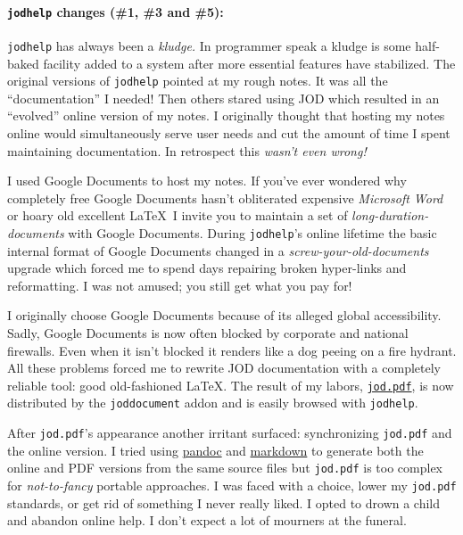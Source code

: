 \paragraph{\texorpdfstring{\texttt{jodhelp} changes (\#1, \#3 and
\#5):}{jodhelp changes (\#1, \#3 and \#5):}}

\texttt{jodhelp} has always been a \emph{kludge.} In programmer speak a
kludge is some half-baked facility added to a system after more
essential features have stabilized. The original versions of
\texttt{jodhelp} pointed at my rough notes. It was all the
``documentation'' I needed! Then others stared using JOD which resulted
in an ``evolved'' online version of my notes. I originally thought that
hosting my notes online would simultaneously serve user needs and cut
the amount of time I spent maintaining documentation. In retrospect this
\emph{wasn't even wrong!}

I used Google Documents to host my notes. If you've ever wondered why
completely free Google Documents hasn't obliterated expensive
\emph{Microsoft Word} or hoary old excellent \LaTeX\ I invite you
to maintain a set of \emph{long-duration-documents} with Google
Documents. During \texttt{jodhelp}'s online lifetime the basic internal
format of Google Documents changed in a \emph{screw-your-old-documents}
upgrade which forced me to spend days repairing broken hyper-links and
reformatting. I was not amused; you still get what you pay for!

I originally choose Google Documents because of its alleged global
accessibility. Sadly, Google Documents is now often blocked by corporate
and national firewalls. Even when it isn't blocked it renders like a dog
peeing on a fire hydrant. All these problems forced me to rewrite JOD
documentation with a completely reliable tool: good old-fashioned
\LaTeX. The result of my labors,
\href{https://github.com/bakerjd99/jod/blob/master/joddocument/pdfdoc/jod.pdf}{\texttt{jod.pdf}}, is now
distributed by the \texttt{joddocument} addon and is easily browsed with
\texttt{jodhelp}.

After \texttt{jod.pdf}'s appearance another irritant surfaced:
synchronizing \texttt{jod.pdf} and the online version. I tried using
\href{http://pandoc.org/}{pandoc} and
\href{http://daringfireball.net/projects/markdown/}{markdown} to
generate both the online and PDF versions from the same source files but
\texttt{jod.pdf} is too complex for \emph{not-to-fancy} portable
approaches. I was faced with a choice, lower my \texttt{jod.pdf}
standards, or get rid of something I never really liked. I opted to
drown a child and abandon online help. I don't expect a lot of mourners
at the funeral.

